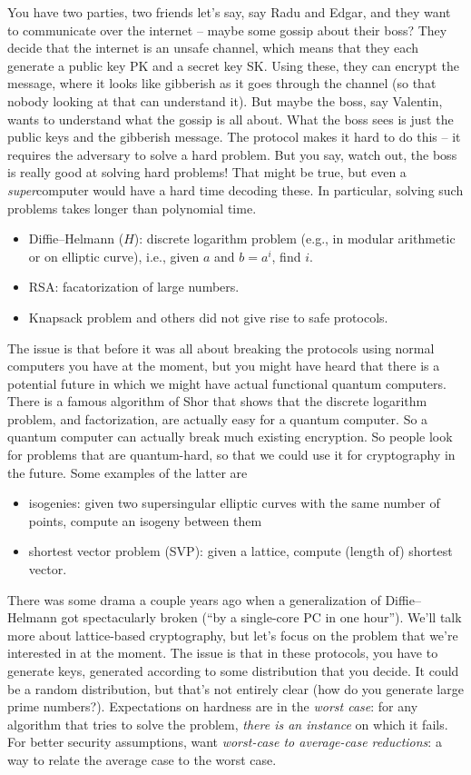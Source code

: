 \documentclass[reqno]{amsart} 
\numberwithin{theorem}{section}
\numberwithin{equation}{section}
\begin{document}
You have two parties, two friends let's say, say Radu and Edgar, and they want to communicate over the internet -- maybe some gossip about their boss?  They decide that the internet is an unsafe channel, which means that they each generate a public key PK and a secret key SK.  Using these, they can encrypt the message, where it looks like gibberish as it goes through the channel (so that nobody looking at that can understand it).  But maybe the boss, say Valentin, wants to understand what the gossip is all about.  What the boss sees is just the public keys and the gibberish message.  The protocol makes it hard to do this -- it requires the adversary to solve a hard problem.  But you say, watch out, the boss is really good at solving hard problems!  That might be true, but even a \emph{super}computer would have a hard time decoding these.  In particular, solving such problems takes longer than polynomial time.
\begin{itemize}
\item Diffie--Helmann ($H$): discrete logarithm problem (e.g., in modular arithmetic or on elliptic curve), i.e., given $a$ and $b = a^i$, find $i$.
\item RSA: facatorization of large numbers.
\item Knapsack problem and others did not give rise to safe protocols.
\end{itemize}
The issue is that before it was all about breaking the protocols using normal computers you have at the moment, but you might have heard that there is a potential future in which we might have actual functional quantum computers.  There is a famous algorithm of Shor that shows that the discrete logarithm problem, and factorization, are actually easy for a quantum computer.  So a quantum computer can actually break much existing encryption.  So people look for problems that are quantum-hard, so that we could use it for cryptography in the future.  Some examples of the latter are
\begin{itemize}
\item isogenies: given two supersingular elliptic curves with the same number of points, compute an isogeny between them
\item shortest vector problem (SVP): given a lattice, compute (length of) shortest vector.
\end{itemize}

There was some drama a couple years ago when a generalization of Diffie--Helmann got spectacularly broken (``by a single-core PC in one hour'').  We'll talk more about lattice-based cryptography, but let's focus on the problem that we're interested in at the moment.  The issue is that in these protocols, you have to generate keys, generated according to some distribution that you decide.  It could be a random distribution, but that's not entirely clear (how do you generate large prime numbers?).  Expectations on hardness are in the \emph{worst case}: for any algorithm that tries to solve the problem, \emph{there is an instance} on which it fails.  For better security assumptions, want \emph{worst-case to average-case reductions}: a way to relate the average case to the worst case.
\end{document}
